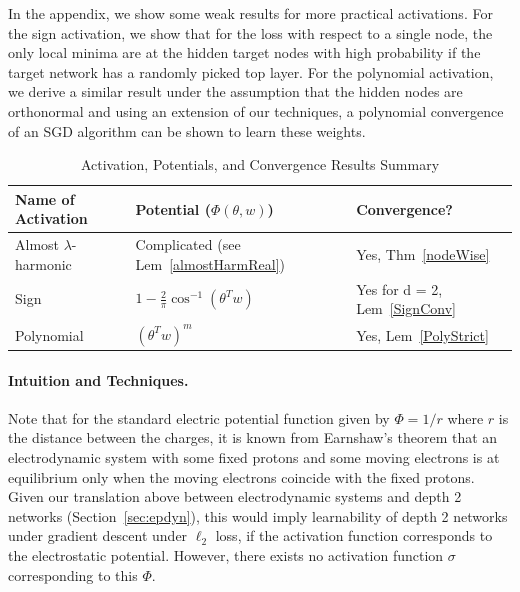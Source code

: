 In the appendix, we show some weak results for more practical activations. For the sign activation, we show that for the loss with respect to a single node, the only local minima are at the hidden target nodes with high probability if the target network has a randomly picked top layer. For the polynomial activation, we derive a similar result under the assumption that the hidden nodes are orthonormal and using an extension of our techniques, a polynomial convergence of an SGD algorithm can be shown to learn these weights.


 \begin{table}[h!]
 \noindent
 \vskip 0.1in
 \begin{center}
 \begin{small}
 \begin{sc}
 \begin{tabular}{
   |p{}%
   |p{}%
   |p{}|%
   }
    \hline 
         Name of Activation&  Potential  ($\Phi(\theta,w)$)    & Convergence? \\ \hline 
        Almost   $\lambda$-harmonic  & Complicated  (see Lem~\ref{almostHarmReal}) & Yes, Thm~\ref{nodeWise}\\
         Sign & $1 - \frac{2}{\pi}\cos^{-1}(\theta^Tw)$       & Yes for d = 2, Lem~\ref{SignConv} \\   
Polynomial  & $(\theta^Tw)^m$       & Yes, Lem~\ref{PolyStrict}  \\        
         \hline
 \end{tabular}
 \end{sc}
 \end{small}
 \end{center}
 \caption{Activation, Potentials, and Convergence Results Summary}
 \label{table1}
 \end{table} 

\paragraph{Intuition and Techniques.}
%
Note that for the standard electric potential function given by $\Phi = 1/r$ where $r$ is the distance between the charges, it is known from Earnshaw's theorem that an electrodynamic system with some fixed protons and some moving electrons is at equilibrium only when the moving electrons coincide with the fixed protons. Given our translation above between electrodynamic systems and depth 2 networks (Section~\ref{sec:epdyn}), this would imply learnability of depth 2 networks under gradient descent under $\ell_2$ loss, if the activation function corresponds to the electrostatic potential. However, there exists no activation function $\sigma$ corresponding to this $\Phi$.
%

